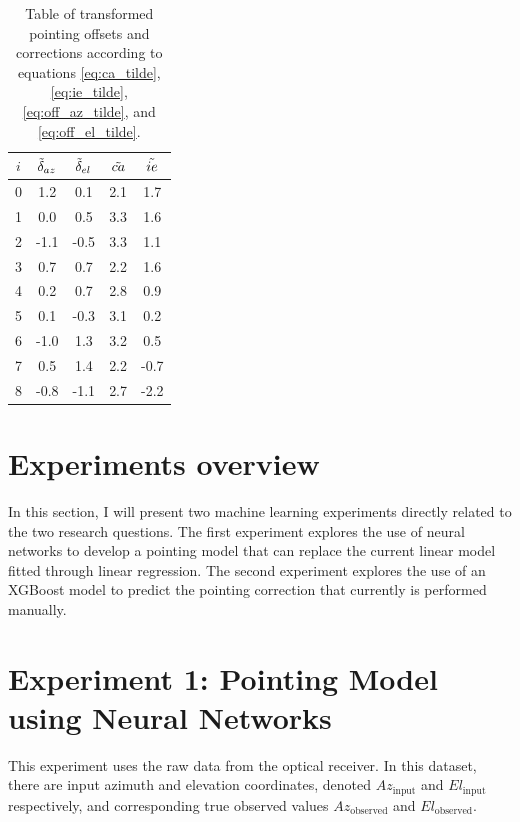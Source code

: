 \begin{table}[H]
    \centering
    \caption{Table of transformed pointing offsets and corrections according to equations \eqref{eq:ca_tilde}, \eqref{eq:ie_tilde}, \eqref{eq:off_az_tilde}, and \eqref{eq:off_el_tilde}.}
    \label{tab:tranform_offsets}
\begin{tabular}{ccccc}
\toprule
$i$ & $\Tilde{\delta}_{az}$ &  $\Tilde{\delta}_{el}$ &  $\Tilde{ca}$ &  $\Tilde{ie}$ \\
\midrule
0 &       1.2 &       0.1 &       2.1 &       1.7 \\
1 &       0.0 &       0.5 &       3.3 &       1.6 \\
2 &      -1.1 &      -0.5 &       3.3 &       1.1 \\
3 &       0.7 &       0.7 &       2.2 &       1.6 \\
4 &       0.2 &       0.7 &       2.8 &       0.9 \\
5 &       0.1 &      -0.3 &       3.1 &       0.2 \\
6 &      -1.0 &       1.3 &       3.2 &       0.5 \\
7 &       0.5 &       1.4 &       2.2 &      -0.7 \\
8 &      -0.8 &      -1.1 &       2.7 &      -2.2 \\
\bottomrule
\end{tabular}
\end{table}

\section{Experiments overview}
In this section, I will present two machine learning experiments directly related to the two research questions.
The first experiment explores the use of neural networks to develop a pointing model that can replace the current linear model fitted through linear regression.
The second experiment explores the use of an XGBoost model to predict the pointing correction that currently is performed manually.

\section{Experiment 1: Pointing Model using Neural Networks}
This experiment uses the raw data from the optical receiver. 
In this dataset, there are input azimuth and elevation coordinates, denoted $Az_{\text{input}}$ and $El_{\text{input}}$ respectively,
and corresponding true observed values $Az_{\text{observed}}$ and $El_{\text{observed}}$.


